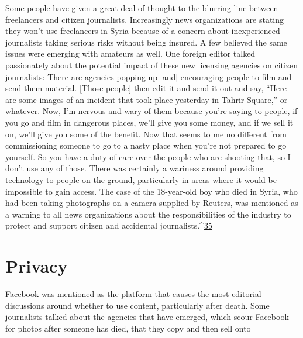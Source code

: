 \begin{enumerate}
Some people have given a great deal of thought to the blurring line between
freelancers and citizen journalists. Increasingly news organizations are stating
they won't use freelancers in Syria because of a concern about inexperienced
journalists taking serious risks without being insured. A few believed
the same issues were emerging with amateurs as well.
One foreign editor talked passionately about the potential impact of these
new licensing agencies on citizen journalists:
There are agencies popping up [and] encouraging people to film and
send them material. [Those people] then edit it and send it out and
say, ``Here are some images of an incident that took place yesterday
in Tahrir Square,'' or whatever. Now, I'm nervous and wary of them
because you're saying to people, if you go and film in dangerous
places, we'll give you some money, and if we sell it on, we'll give you
some of the benefit. Now that seems to me no different from commissioning
someone to go to a nasty place when you're not prepared
to go yourself. So you have a duty of care over the people who are
shooting that, so I don't use any of those.
There was certainly a wariness around providing technology to people
on the ground, particularly in areas where it would be impossible to gain
access. The case of the 18-year-old boy who died in Syria, who had been
taking photographs on a camera supplied by Reuters, was mentioned as a
warning to all news organizations about the responsibilities of the industry
to protect and support citizen and accidental journalists.^{\href{#endnotes}{35}}
\section{Privacy}
Facebook was mentioned as the platform that causes the most editorial
discussions around whether to use content, particularly after death. Some
journalists talked about the agencies that have emerged, which scour Facebook
for photos after someone has died, that they copy and then sell onto


\end{enumerate}
